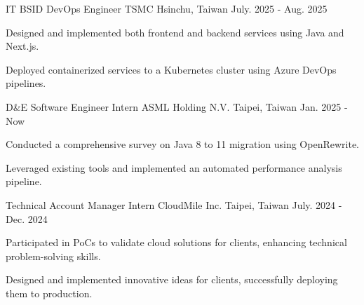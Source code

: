 

\begin{cventries}

    \cventry
    {IT BSID DevOps Engineer} %
    {TSMC} %
    {Hsinchu, Taiwan} %
    {July. 2025 - Aug. 2025} %
    {
      \begin{cvitems} %
        \item {Designed and implemented both frontend and backend services using Java and Next.js.}
        \item {Deployed containerized services to a Kubernetes cluster using Azure DevOps pipelines.}
      \end{cvitems}
    }

    \cventry
    {D\&E Software Engineer Intern} %
    {ASML Holding N.V.} %
    {Taipei, Taiwan} %
    {Jan. 2025 - Now} %
    {
      \begin{cvitems} %
        \item {Conducted a comprehensive survey on Java 8 to 11 migration using OpenRewrite.
        }
        \item{Leveraged existing tools and implemented an automated performance analysis pipeline.
        }
      \end{cvitems}
    }

    \cventry
    {Technical Account Manager Intern} %
    {CloudMile Inc.} %
    {Taipei, Taiwan} %
    {July. 2024 - Dec. 2024} %
    {
      \begin{cvitems} %
        \item {Participated in PoCs to validate cloud solutions for clients, enhancing technical problem-solving skills.}
        \item {Designed and implemented innovative ideas for clients, successfully deploying them to production.}
      \end{cvitems}
    }



\end{cventries}
